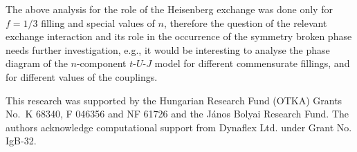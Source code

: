 \documentclass[aps,prb,twocolumn,floatfix,showpacs]{revtex4}
\begin{document}
The above analysis for the role of the Heisenberg exchange was done only for
$f=1/3$ filling and special values of $n$, therefore the question of the
relevant exchange interaction and its role in the occurrence of the symmetry
broken phase needs further investigation, e.g., it would be interesting to
analyse the phase diagram of the $n$-component $t$-$U$-$J$ model for different
commensurate fillings, and for different values of the couplings. 


This research was supported by the Hungarian Research Fund (OTKA)
Grants No.\ K 68340, F 046356 and NF 61726 and the J\'anos Bolyai Research
Fund.  The authors acknowledge computational support from Dynaflex Ltd. under
Grant No. IgB-32.
\end{document}
